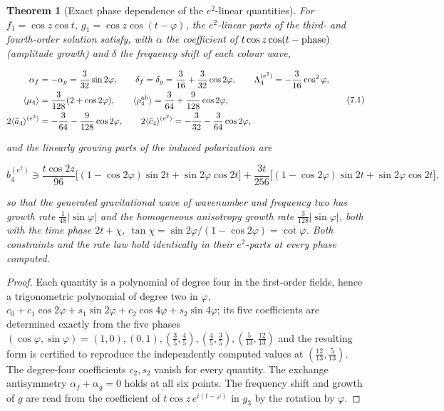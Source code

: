 \documentclass[11pt]{article}
\newtheorem{theorem}{Theorem}[section]
\theoremstyle{remark}
\begin{document}
\begin{theorem}[Exact phase dependence of the \(e^2\)-linear quantities]
\label{thm:v20v4-laws}
For \(f_1=\cos z\cos t\), \(g_1=\cos z\cos(t-\varphi)\), the
\(e^2\)-linear parts of the third- and fourth-order solution satisfy,
with \(\alpha\) the coefficient of \(t\cos z\cos(t-\hbox{phase})\)
(amplitude growth) and \(\delta\) the frequency shift of each colour
wave,

\[
\begin{aligned}
 \alpha_f&=-\alpha_g=\frac3{32}\sin2\varphi,\qquad
 \delta_f=\delta_g=\frac3{16}+\frac3{32}\cos2\varphi,\qquad
 \Lambda_4^{(e^2)}=-\frac3{16}\cos^2\varphi,\\
 \langle\mu_4\rangle&=\frac3{128}(2+\cos2\varphi),\qquad
 \langle\rho^{\rm ab}_4\rangle=\frac3{64}+\frac9{128}\cos2\varphi,\\
 2\langle\ddot a_4\rangle^{(e^2)}&=-\frac3{64}-\frac9{128}\cos2\varphi,\qquad
 2\langle\ddot c_4\rangle^{(e^2)}=-\frac3{32}-\frac3{64}\cos2\varphi,
\end{aligned}                                                          \tag{7.1}
\]

and the linearly growing parts of the induced polarization are

\[
 b_4^{(e^2)}\ni\frac{t\cos2z}{96}\bigl[(1-\cos2\varphi)\sin2t+\sin2\varphi\cos2t\bigr]
 +\frac{3t}{256}\bigl[(1-\cos2\varphi)\sin2t+\sin2\varphi\cos2t\bigr],  \tag{7.2}
\]

so that the generated gravitational wave of wavenumber and frequency
two has growth rate \(\tfrac1{48}|\sin\varphi|\) and the homogeneous
anisotropy growth rate \(\tfrac3{128}|\sin\varphi|\), both with the
time phase \(2t+\chi\), \(\tan\chi=\sin2\varphi/(1-\cos2\varphi)=\cot\varphi\).
Both constraints and the rate law hold identically in their
\(e^2\)-parts at every phase computed.
\end{theorem}

\begin{proof}
Each quantity is a polynomial of degree four in the first-order
fields, hence a trigonometric polynomial of degree two in \(\varphi\),
\(c_0+c_1\cos2\varphi+s_1\sin2\varphi+c_2\cos4\varphi+s_2\sin4\varphi\);
its five coefficients are determined exactly from the five phases
\((\cos\varphi,\sin\varphi)=(1,0),(0,1),(\tfrac35,\tfrac45),(\tfrac45,\tfrac35),(\tfrac5{13},\tfrac{12}{13})\)
and the resulting form is certified to reproduce the independently
computed values at \((\tfrac{12}{13},\tfrac5{13})\).  The degree-four
coefficients \(c_2,s_2\) vanish for every quantity.  The exchange
antisymmetry \(\alpha_f+\alpha_g=0\) holds at all six points.  The
frequency shift and growth of \(g\) are read from the coefficient of
\(t\cos z\,e^{i(t-\varphi)}\) in \(g_3\) by the rotation by \(\varphi\).
\end{proof}
\end{document}
